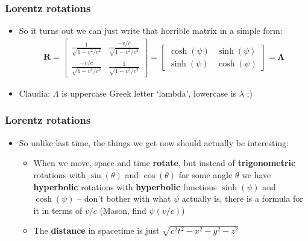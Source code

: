 \documentclass{beamer}
\begin{document}
\begin{frame}
  \frametitle{Lorentz rotations}
  \begin{itemize}
    \item<1-> So it turns out we can just write that horrible matrix in a simple form:
      \begin{align*}
	\mathbf{R}=
	\begin{bmatrix}
	  \frac{1}{\sqrt{1-v^2/c^2}} & \frac{-v/c}{\sqrt{1-v^2/c^2}}\\
	  \frac{-v/c}{\sqrt{1-v^2/c^2}} & \frac{1}{\sqrt{1-v^2/c^2}}
	\end{bmatrix}
	=
	\begin{bmatrix}
	  \cosh(\psi) & \sinh(\psi)\\
	  \sinh(\psi) & \cosh(\psi)
	\end{bmatrix}
	=\mathbf{\Lambda}
      \end{align*}
    \item<2-> Claudia: $\Lambda$ is uppercase Greek letter `lambda', lowercase is $\lambda$ ;) 
  \end{itemize}
\end{frame}

\begin{frame}
  \frametitle{Lorentz rotations}
  \begin{itemize}
    \item<1-> So unlike last time, the things we get now should actually be interesting:
      \begin{itemize}
	\item<2-> When we move, space and time \textbf{rotate}, but instead of \textbf{trigonometric} rotations with $\sin(\theta)$ and $\cos(\theta)$ for some angle $\theta$ we have \textbf{hyperbolic} rotations with \textbf{hyperbolic} functions $\sinh(\psi)$ and $\cosh(\psi)$ -- don't bother with what $\psi$ actually is, there is a formula for it in terms of $v/c$ (Mason, find $\psi(v/c)$)
	\item<3-> The \textbf{distance} in spacetime is just $\sqrt{c^2t^2-x^2-y^2-z^2}$
      \end{itemize}
  \end{itemize}
\end{frame}
\end{document}
